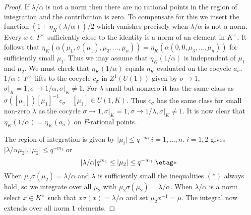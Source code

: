 \documentclass{memo-l}
\theoremstyle{definition}
\theoremstyle{remark}
\numberwithin{section}{chapter}
\numberwithin{equation}{chapter}
\begin{document}
\begin{proof}
   If ${\lambda}/{\alpha}$ is not a norm then there are no rational points
in the region of integration and the contribution is zero.  To compensate
for this we insert the function $(1+{\eta}_{K}({\lambda}/{\alpha}))/2$
which vanishes precisely when ${\lambda}/{\alpha}$ is not a norm.  Every
$x \in F^{\times}$ sufficiently close to the identity is a norm of an
element in $K^{\times}$.  It follows that
${\eta}_{K}({\alpha}({\mu}_{1},{\sigma}({\mu}_{1}),{\mu}_{3},\ldots
,{\mu}_{n})) = {\eta}_{K}({\alpha}(0,0,{\mu}_{3},\ldots ,{\mu}_{n}))$ for
sufficiently small ${\mu}_{1}$.  Thus we may assume that
${\eta}_{K}(1/{\alpha})$ is independent of ${\mu}_{1}$ and ${\mu}_{2}$.  We
must check that ${\eta}_{K}(1/{\alpha})$ equals ${\eta}_{K}$ evaluated on
the cocycle $a_{{\sigma}}$.  $1/{\alpha}  \in  F^{\times}$ lifts to the cocycle
$c_{{\sigma}}$ in $Z^{1}(U(1))$ given by ${\sigma} {\to} 1$, ${\sigma}\vert
_{K} = 1, {\sigma} {\to} 1/{\alpha}, {\sigma}\vert _{K} \ne 1$.  For
${\lambda}$ small but nonzero it has the same class as
${\sigma}([{\mu}_{1}])[{\mu}_{1}]^{-1}c_{{\sigma}} \quad [{\mu}_{1}]  \in
U(1,K)$.  Thus $c_{{\sigma}}$ has the same class for small non-zero
${\lambda}$ as the cocycle ${\sigma} {\to} 1, {\sigma}\vert _{K} = 1,
{\sigma} {\to} 1/{\lambda}, {\sigma}\vert _{K} \ne 1$.  It is now clear
that ${\eta}_{K}(1/{\alpha}) = {\eta}_{K}(a_{{\sigma}})$ on $F$-rational
points.

   The region of integration is given by $\vert {\mu}_{i}\vert \le
q^{-m_{i}} \ i = 1,\ldots ,n$.  $i = 1,2$ gives $\vert
{\lambda}/{\alpha}{\mu}_{2}\vert , \vert {\mu}_{2}\vert \le
q^{-m_{1}}$ or
\begin{equation}
\vert {\lambda}/{\alpha}\vert q^{m_{1}} \le \vert
{\mu}_{2}\vert \le q^{-m_{1}} .	  \etag *
\end{equation}
When ${\mu}_{2}{\sigma}({\mu}_{2}) = {\lambda}/{\alpha}$ and ${\lambda}$ is
sufficiently small the inequalities $(*)$ always hold, so we integrate over
all ${\mu}_{2}$ with ${\mu}_{2}{\sigma}({\mu}_{2}) = {\lambda}/{\alpha}$.
When ${\lambda}/{\alpha}$ is a norm select $x  \in  K^{\times}$ such that
$x{\sigma}(x) = {\lambda}/{\alpha}$ and set ${\mu}_{2}x^{-1} = {\mu}$.  The
integral now extends over all norm $1$ elements.


\end{proof}
\end{document}

